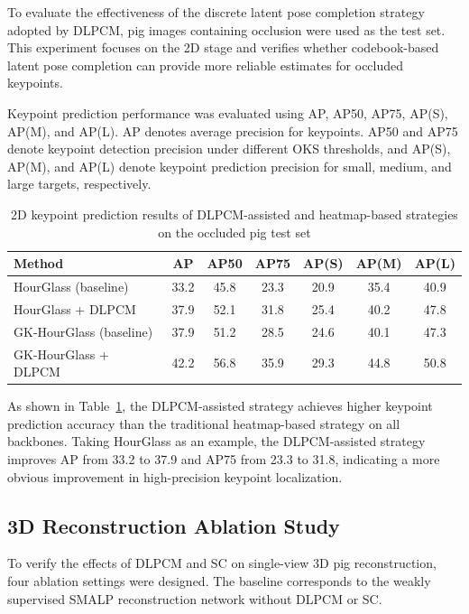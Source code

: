 \documentclass[runningheads]{llncs}
\begin{document}
To evaluate the effectiveness of the discrete latent pose completion strategy adopted by DLPCM, pig images containing occlusion were used as the test set. This experiment focuses on the 2D stage and verifies whether codebook-based latent pose completion can provide more reliable estimates for occluded keypoints.

Keypoint prediction performance was evaluated using AP, AP50, AP75, AP(S), AP(M), and AP(L). AP denotes average precision for keypoints. AP50 and AP75 denote keypoint detection precision under different OKS thresholds, and AP(S), AP(M), and AP(L) denote keypoint prediction precision for small, medium, and large targets, respectively.

\begin{table}
\caption{2D keypoint prediction results of DLPCM-assisted and heatmap-based strategies on the occluded pig test set}
\label{tab:2d_results}
\begin{tabular}{|l|c|c|c|c|c|c|}
\hline
Method & AP & AP50 & AP75 & AP(S) & AP(M) & AP(L) \\
\hline
HourGlass (baseline) & 33.2 & 45.8 & 23.3 & 20.9 & 35.4 & 40.9 \\
HourGlass + DLPCM & 37.9 & 52.1 & 31.8 & 25.4 & 40.2 & 47.8 \\
\hline
GK-HourGlass (baseline) & 37.9 & 51.2 & 28.5 & 24.6 & 40.1 & 47.3 \\
GK-HourGlass + DLPCM & 42.2 & 56.8 & 35.9 & 29.3 & 44.8 & 50.8 \\
\hline
\end{tabular}
\end{table}

As shown in Table~\ref{tab:2d_results}, the DLPCM-assisted strategy achieves higher keypoint prediction accuracy than the traditional heatmap-based strategy on all backbones. Taking HourGlass as an example, the DLPCM-assisted strategy improves AP from 33.2 to 37.9 and AP75 from 23.3 to 31.8, indicating a more obvious improvement in high-precision keypoint localization.

\subsection{3D Reconstruction Ablation Study}
\label{subsec:3d_ablation}

To verify the effects of DLPCM and SC on single-view 3D pig reconstruction, four ablation settings were designed. The baseline corresponds to the weakly supervised SMALP reconstruction network without DLPCM or SC.
\end{document}

